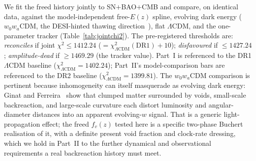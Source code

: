 \documentclass[aps,prd,twocolumn,nofootinbib,superscriptaddress,floatfix]{revtex4-2}
\newcommand{\fvz}{f_{v}(z)}
\newcommand{\Lcdm}{\Lambda\mathrm{CDM}}
\begin{document}
We fit the freed history jointly to SN$+$BAO$+$CMB and compare, on identical
data, against the model-independent free-$E(z)$ spline, evolving dark energy
($w_0w_a$CDM, the DESI-hinted thawing direction~\cite{DESI2024}), flat $\Lcdm$,
and the one-parameter tracker
(Table~\ref{tab:jointchi2}). The pre-registered thresholds
\cite{Paper1} are: \emph{reconciles} if joint $\chi^2\le1412.24$
($=\chi^2_{\Lcdm}(\mathrm{DR1})+10$); \emph{disfavoured} if $\le1427.24$;
\emph{amplitude-dead} if $\ge1469.29$ (the tracker value). Part~I is referenced to
the DR1 $\Lcdm$ baseline ($\chi^2_{\Lcdm}=1402.24$); Part~II's model-comparison
bars are referenced to the DR2 baseline ($\chi^2_{\Lcdm}=1399.81$). The
$w_0w_a$CDM comparison is pertinent because inhomogeneity can itself masquerade as
evolving dark energy: Ginat and Ferreira~\cite{GinatFerreira2026} show that clumped
matter surrounded by voids, small-scale backreaction, and large-scale curvature
each distort luminosity and angular-diameter distances into an apparent
evolving-$w$ signal. That is a generic light-propagation effect; the freed $\fvz$
tested here is a specific two-phase Buchert realisation of it, with a definite
present void fraction and clock-rate dressing, which we hold in Part~II to the
further dynamical and observational requirements a real backreaction history must
meet.
\end{document}
